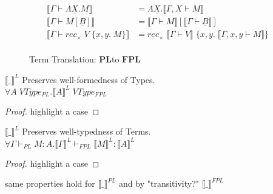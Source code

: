 \documentclass[acmsmall]{acmart}
\newcommand{\den}[1]{\llbracket #1\rrbracket}
\newcommand{\pl}{$\mathbf{PL}$}
\newcommand{\fpl}{$\mathbf{FPL}$}
\begin{document}
\begin{figure}[H]
\begin{align*}
  \den{\Gamma \vdash \Lambda \underline{X}.M} &= \Lambda \underline{X}. \den{\Gamma , \underline{X} \vdash M} \\
  \den{\Gamma \vdash M[\underline{B}]} &= \den{\Gamma \vdash M}[\den{\Gamma \vdash \underline{B}}] \\
  \den{\Gamma \vdash rec_\times \;V \;\{x,y.\;M\}} &= rec_\times \;\den{\Gamma \vdash V}\;\{x,y.\; \den{\Gamma, x,y \vdash M}\} \\
  \end{align*}
  \caption{Term Translation: \pl to \fpl}
  \label{fig:TermTranslationPLFPL}
  \end{figure}

\begin{theorem} $\den{\_}^L$ Preserves well-formedness of Types.\\
  $\forall A \;VType_{PL}. \den{A}^L \;VType_{FPL}$
  \end{theorem}
  
  \begin{proof}
    highlight a case
  \end{proof}


  \begin{theorem} $\den{\_}^L$ Preserves well-typedness of Terms.\\
    $\forall \Gamma \vdash_{PL} M : A. \den{\Gamma}^L \vdash_{FPL} \den{M}^L : \den{A}^L$
    \end{theorem}
    
    \begin{proof}
      highlight a case
    \end{proof}

    same properties hold for $\den{\_}^{PL}$ and by "transitivity?" $\den{\_}^{FPL}$ 
\end{document}
